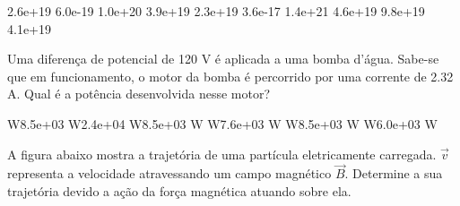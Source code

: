 \documentclass[12pt, addpoints]{exam}
\begin{document}
\begin{questions}
\begin{multicols*}{2}
\begin{oneparchoices}
\choice 2.6e+19 \choice 6.0e-19 \choice 1.0e+20 \choice 3.9e+19 \choice 2.3e+19 \choice 3.6e-17 \choice 1.4e+21 \choice 4.6e+19 \choice 9.8e+19 \choice 4.1e+19 
\end{oneparchoices}\question Uma diferença de potencial de 120 V é aplicada a uma bomba d’água. Sabe-se que em funcionamento, o motor da bomba é percorrido por uma corrente de    2.32 A. Qual é a potência desenvolvida nesse motor?

\begin{oneparchoices}
 W\choice 8.5e+03 W\choice 2.4e+04 W\choice 8.5e+03 W W\choice 7.6e+03 W W\choice 8.5e+03 W W\choice 6.0e+03 W
\end{oneparchoices}\question A ﬁgura abaixo mostra a trajetória de uma partícula eletricamente carregada. $\vec{{v}}$ representa a velocidade atravessando um campo magnético $\vec{{B}}$. Determine a sua trajetória devido a ação da força magnética atuando sobre ela.
        
        \begin{center}
            \begin{minipage}[c]{0.5\linewidth}
            \end{minipage}
        \end{center}

        


\end{multicols*}
\end{questions}
\end{document}

